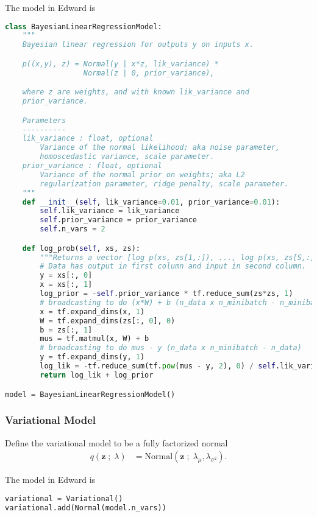 The model in Edward is
\begin{lstlisting}[language=Python]
class BayesianLinearRegressionModel:
    """
    Bayesian linear regression for outputs y on inputs x.

    p((x,y), z) = Normal(y | x*z, lik_variance) *
                  Normal(z | 0, prior_variance),

    where z are weights, and with known lik_variance and
    prior_variance.

    Parameters
    ----------
    lik_variance : float, optional
        Variance of the normal likelihood; aka noise parameter,
        homoscedastic variance, scale parameter.
    prior_variance : float, optional
        Variance of the normal prior on weights; aka L2
        regularization parameter, ridge penalty, scale parameter.
    """
    def __init__(self, lik_variance=0.01, prior_variance=0.01):
        self.lik_variance = lik_variance
        self.prior_variance = prior_variance
        self.n_vars = 2

    def log_prob(self, xs, zs):
        """Returns a vector [log p(xs, zs[1,:]), ..., log p(xs, zs[S,:])]."""
        # Data has output in first column and input in second column.
        y = xs[:, 0]
        x = xs[:, 1]
        log_prior = -self.prior_variance * tf.reduce_sum(zs*zs, 1)
        # broadcasting to do (x*W) + b (n_data x n_minibatch - n_minibatch)
        x = tf.expand_dims(x, 1)
        W = tf.expand_dims(zs[:, 0], 0)
        b = zs[:, 1]
        mus = tf.matmul(x, W) + b
        # broadcasting to do mus - y (n_data x n_minibatch - n_data)
        y = tf.expand_dims(y, 1)
        log_lik = -tf.reduce_sum(tf.pow(mus - y, 2), 0) / self.lik_variance
        return log_lik + log_prior

model = BayesianLinearRegressionModel()
\end{lstlisting}


\subsubsection{Variational Model}
Define the variational model to be a fully factorized normal
\begin{align*}
  q(\mathbf{z} \;;\; \lambda)
  &=
  \text{Normal}(\mathbf{z} \;;\; \lambda_\mu, \lambda_{\sigma^2}).
\end{align*}

The model in Edward is
\begin{lstlisting}[language=Python]
variational = Variational()
variational.add(Normal(model.n_vars))
\end{lstlisting}


